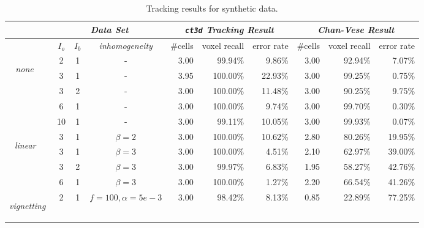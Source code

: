 \begin{table}
  \caption{Tracking results for synthetic data. }
  \centering
	\footnotesize
  \begin{threeparttable}
  \begin{tabular}{|c|ccc|rrr|rrr|}
\hline
&
\multicolumn{3}{|c}{\emph{Data Set}} &
\multicolumn{3}{|c}{\emph{\texttt{ct3d} Tracking Result}} &
\multicolumn{3}{|c|}{\emph{Chan-Vese Result}} \\\hline
&$I_o$ & $I_b$ &\emph{inhomogeneity}&\#cells&voxel recall& error rate            &\#cells         &voxel recall  & error rate\\\hline
\multirow{3}{*}{\begin{sideways}\emph{none\,\,\,\,\,\,}\end{sideways}}
& 2    & 1     & -                  & 3.00  & 99.94\%    &        9.86\%         &3.00	& 92.94\%	& 7.07\%\\	
& 3    & 1     & -                  & 3.95  & 100.00\%   &       22.93\%         &3.00	& 99.25\%	& 0.75\%\\	  
& 3    & 2     & -                  & 3.00  & 100.00\%   &       11.48\%         &3.00	& 90.25\%	& 9.75\%\\	
& 6    & 1     & -                  & 3.00  & 100.00\%   &        9.74\%         &3.00	& 99.70\%	& 0.30\%\\	
& 10   & 1     & -                  & 3.00  & 99.11\%    &       10.05\%         &3.00	& 99.93\%	& 0.07\%\\	
\hline\multirow{3}{*}{\begin{sideways}\emph{linear\,\,\,\,\,}\end{sideways}}      	  		  		
& 3    & 1     & $\beta=2$          & 3.00  & 100.00\%   &       10.62\%         &2.80	& 80.26\%	& 19.95\%\\	
& 3    & 1     & $\beta=3$          & 3.00  & 100.00\%   &        4.51\%         &2.10	& 62.97\%	& 39.00\%\\	
& 3    & 2     & $\beta=3$          & 3.00  & 99.97\%    &        6.83\%         &1.95	& 58.27\%	& 42.76\%\\	
& 6    & 1     & $\beta=3$          & 3.00  & 100.00\%   &        1.27\%         &2.20	& 66.54\%	& 41.26\%\\	
\hline\multirow{3}{*}{\begin{sideways}\emph{vignetting\,\,}\end{sideways}}        	  		  		
& 2    & 1     & $f=100,\alpha=5e-3$& 3.00  & 98.42\%    &        8.13\%         &0.85	& 22.89\%	& 77.25\%\\	

\end{tabular}
\end{threeparttable}
\end{table}
